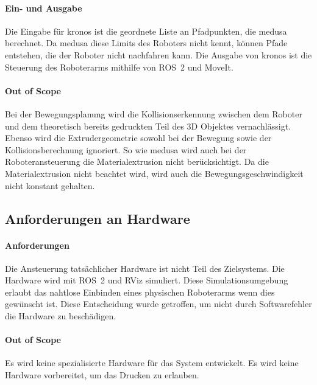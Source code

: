             \paragraph{Ein- und Ausgabe}
            Die Eingabe für \ac{kronos} ist die geordnete Liste an Pfadpunkten, die \ac{medusa} berechnet.
            Da \ac{medusa} diese Limits des Roboters nicht kennt, können Pfade entstehen, die der Roboter nicht nachfahren kann.
            Die Ausgabe von \ac{kronos} ist die Steuerung des Roboterarms mithilfe von \ac{ROS}~2 und MoveIt.

            \paragraph{Out of Scope}
            Bei der Bewegungsplanung wird die Kollisionserkennung zwischen dem Roboter und dem theoretisch bereits gedruckten Teil des 3D Objektes vernachlässigt.
            Ebenso wird die Extrudergeometrie sowohl bei der Bewegung sowie der Kollisionsberechnung ignoriert.
            So wie \ac{medusa} wird auch bei der Roboteransteuerung die Materialextrusion nicht berücksichtigt.
            Da die Materialextrusion nicht beachtet wird, wird auch die Bewegungsgeschwindigkeit nicht konstant gehalten.
        
        \subsection{Anforderungen an Hardware}
            \paragraph{Anforderungen}
            Die Ansteuerung tatsächlicher Hardware ist nicht Teil des Zielsystems.
            Die Hardware wird mit \ac{ROS}~2 und RViz simuliert.
            Diese Simulationsumgebung erlaubt das nahtlose Einbinden eines physischen Roboterarms wenn dies gewünscht ist.
            Diese Entscheidung wurde getroffen, um nicht durch Softwarefehler die Hardware zu beschädigen.

            \paragraph{Out of Scope}
            Es wird keine spezialisierte Hardware für das System entwickelt.
            Es wird keine Hardware vorbereitet, um das Drucken zu erlauben.

